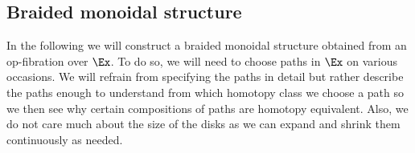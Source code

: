 \subsection{Braided monoidal structure}

In the following we will construct a braided monoidal structure obtained from an op-fibration over $\Ex$.
To do so, we will need to choose paths in $\Ex$ on various occasions. We will refrain from specifying
the paths in detail but rather describe the paths enough to understand from which homotopy class we
choose a path so we then see why certain compositions of paths are homotopy equivalent. 
Also, we do not care much about the size of the
disks as we can expand and shrink them continuously as needed.

